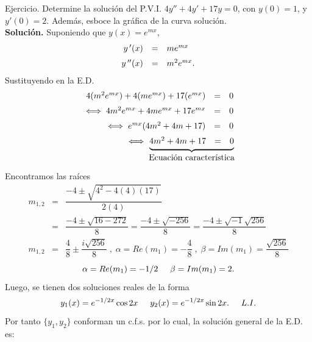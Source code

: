 \documentclass{beamer}
\begin{document}
\begin{frame}[t]
	\begin{alertblock}{Ejercicio.}
		Determine la solución del P.V.I. \(4y'' +4y' +17y=0\), con \(y(0) =1\), y \(y'(0) =2\). Además, esboce la gráfica de la curva solución. \\[2mm]
		\textbf{Solución.} Suponiendo que \(y(x) = e^{mx}\),
		\[
			\begin{array}{rcl}
				y\,' (x) & = & me^{mx} \\[2mm]
				y\,'' (x) & = & m^2e^{mx} .
			\end{array} \vspace{-3mm}
		\]
		Sustituyendo en la E.D.
		\[
			\begin{array}{rcl}
				4(m^2e^{mx}) +4(me^{mx}) +17(e^{mx}) & = & 0 \\[2mm]
				\iff 4m^2e^{mx} +4me^{mx} +17e^{mx} & = & 0 \\[2mm]
				\iff e^{mx} (4m^2+4m+17) & = & 0 \\[2mm]
				\iff \underbrace{\begin{matrix} 4m^2+4m+17 & = & 0\end{matrix}} _{\mbox{Ecuación característica}} \hspace{-12mm}
			\end{array}
		\]
	\end{alertblock}
\end{frame}

\begin{frame}[t]
	\begin{alertblock}{}
		Encontramos las raíces
		\[
			\begin{array}{rcl}
				m_{1,2} & = & \dfrac{-4 \pm \sqrt{4^2-4(4) (17)}}{2(4)} \\[2mm]
				& = & \dfrac{-4 \pm \sqrt{16-272}}{8} = \dfrac{-4 \pm \sqrt{-256}}{8} = \dfrac{-4 \pm \sqrt{-1} \sqrt{256}}{8} \\[2mm]
				m_{1,2} & = & \dfrac{4}{8} \pm \dfrac{i \sqrt{256}}{8} \;,\; \alpha = Re(m_1) = - \dfrac{4}{8} \;,\; \beta = Im(m_1) = \dfrac{\sqrt{256}}{8}
			\end{array}
		\]
		\[
			\alpha = Re(m_1) = -1/2 \hspace{5mm} \beta = Im(m_1) = 2.
		\]
		Luego, se tienen dos soluciones reales de la forma
		\[
			y_1(x) = e^{-1/2x} \cos 2x \hspace{5mm} y_2(x) = e^{-1/2x} \sin 2x. \hspace{5mm} L.I.
		\]
		Por tanto \(\{y_1,y_2\}\) conforman un c.f.s. por lo cual, la solución general de la E.D. es:
	\end{alertblock}
\end{frame}
\end{document}

